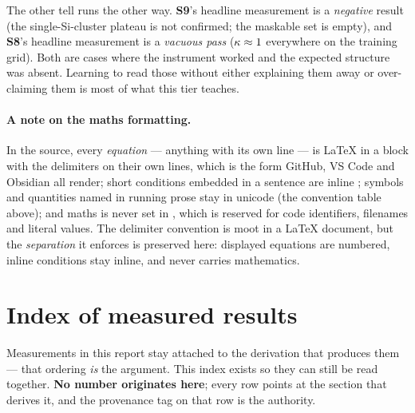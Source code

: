 The other tell runs the other way. \textbf{S9}'s headline measurement is a
\emph{negative} result (the single-Si-cluster plateau is not confirmed; the
maskable set is empty), and \textbf{S8}'s headline measurement is a \emph{vacuous
pass} ($\kappa \approx 1$ everywhere on the training grid). Both are cases where
the instrument worked and the expected structure was absent. Learning to read
those without either explaining them away or over-claiming them is most of what
this tier teaches.

\paragraph{A note on the maths formatting.} In the source, every \emph{equation}
--- anything with its own line --- is \LaTeX{} in a \code{\$\$ \ldots \$\$}
block with the delimiters on their own lines, which is the form GitHub, VS Code
and Obsidian all render; short conditions embedded in a sentence are inline
\code{\$\ldots\$}; symbols and quantities named in running prose stay in unicode
(the convention table above); and maths is never set in , which
is reserved for code identifiers, filenames and literal values. The delimiter
convention is moot in a \LaTeX{} document, but the \emph{separation} it enforces
is preserved here: displayed equations are numbered, inline conditions stay
inline, and  never carries mathematics.

\section*{Index of measured results}
\label{sec:resultsindex}

Measurements in this report stay attached to the derivation that produces them
--- that ordering \emph{is} the argument. This index exists so they can still be
read together. \textbf{No number originates here}; every row points at the
section that derives it, and the provenance tag on that row is the authority.

